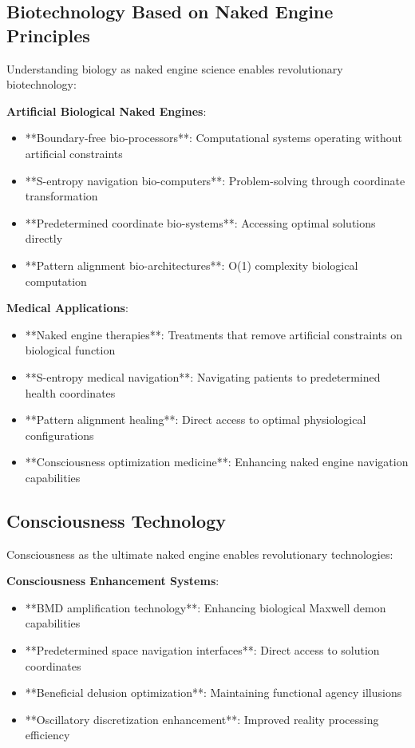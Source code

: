 \documentclass[12pt,a4paper]{article}
\begin{document}
\subsection{Biotechnology Based on Naked Engine Principles}

Understanding biology as naked engine science enables revolutionary biotechnology:

\textbf{Artificial Biological Naked Engines}:
\begin{itemize}
\item **Boundary-free bio-processors**: Computational systems operating without artificial constraints
\item **S-entropy navigation bio-computers**: Problem-solving through coordinate transformation
\item **Predetermined coordinate bio-systems**: Accessing optimal solutions directly
\item **Pattern alignment bio-architectures**: O(1) complexity biological computation
\end{itemize}

\textbf{Medical Applications}:
\begin{itemize}
\item **Naked engine therapies**: Treatments that remove artificial constraints on biological function
\item **S-entropy medical navigation**: Navigating patients to predetermined health coordinates  
\item **Pattern alignment healing**: Direct access to optimal physiological configurations
\item **Consciousness optimization medicine**: Enhancing naked engine navigation capabilities
\end{itemize}

\subsection{Consciousness Technology}

Consciousness as the ultimate naked engine enables revolutionary technologies:

\textbf{Consciousness Enhancement Systems}:
\begin{itemize}
\item **BMD amplification technology**: Enhancing biological Maxwell demon capabilities
\item **Predetermined space navigation interfaces**: Direct access to solution coordinates
\item **Beneficial delusion optimization**: Maintaining functional agency illusions
\item **Oscillatory discretization enhancement**: Improved reality processing efficiency
\end{itemize}
\end{document}
